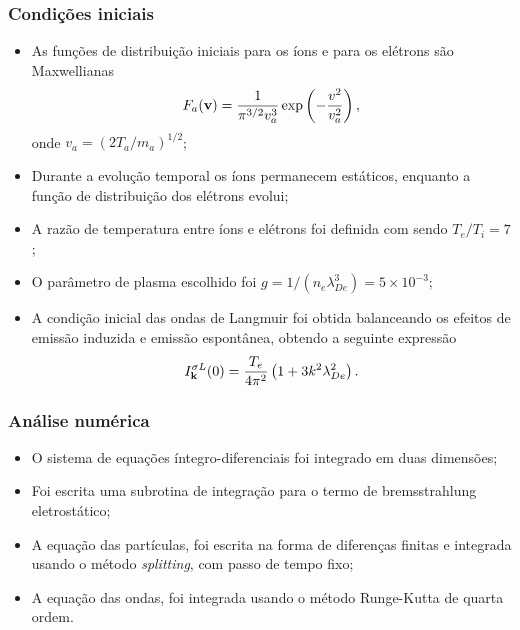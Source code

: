 \documentclass[10pt,aspectratio=1610,lualatex]{beamer}
\begin{document}
\begin{frame}
  \frametitle{Condições iniciais}
  \begin{itemize}
    \item As funções de distribuição iniciais para os íons e para os
    elétrons são Maxwellianas
    \begin{displaymath}
      F_a({\bf v})=\frac{1}{\pi^{3/2}v_a^3}
      \exp \left(-\frac{v^2}{v_a^2}\right),
    \end{displaymath}
    onde $v_a=(2T_a/m_a)^{1/2}$;
    \vspace{0.1cm}
    \pause
    \item Durante a evolução temporal os íons permanecem estáticos,
    enquanto a função de distribuição dos elétrons evolui;
    \vspace{0.1cm}
    \pause
    \item A razão de temperatura entre íons e elétrons foi
    definida com sendo $T_e/T_i=7$;
    \vspace{0.1cm}
    \pause
    \item O parâmetro de plasma escolhido foi
    $g=1/(n_e\lambda_{De}^3)=5\times 10^{-3}$;
    \vspace{0.1cm}
    \pause
    \item A condição inicial das ondas de Langmuir foi
    obtida balanceando os efeitos de emissão induzida e
    emissão espontânea, obtendo a seguinte expressão
    \begin{displaymath}
      I_{\bf k}^{\sigma L}(0)=\frac{T_e}{4\pi^2}
      \left( 1+3k^2\lambda_{De}^2\right).
    \end{displaymath}
  \end{itemize}
\end{frame}

\begin{frame}
  \frametitle{Análise numérica}
  \begin{itemize}
    \item O sistema de equações íntegro-diferenciais foi integrado
    em duas dimensões;
    \vspace{0.3cm}
    \pause
    \item Foi escrita uma subrotina de integração para o termo
    de bremsstrahlung eletrostático;
    \vspace{0.3cm}
    \pause
    \item A equação das partículas, foi escrita na forma de diferenças
    finitas e integrada usando o método \emph{splitting}, com passo de
    tempo fixo;
    \vspace{0.3cm}
    \pause
    \item A equação das ondas, foi integrada usando o método Runge-Kutta
    de quarta ordem.
  \end{itemize}
\end{frame}
\end{document}
